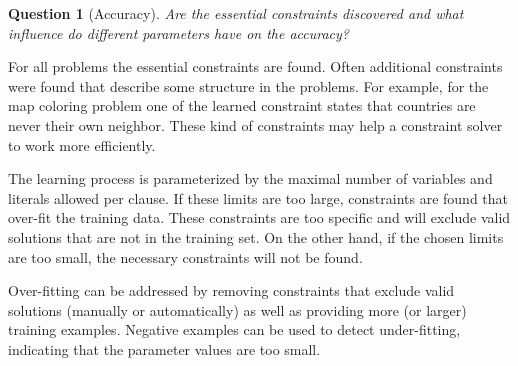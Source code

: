 \documentclass[letterpaper]{article}
\newtheorem{question}{Question}
\theoremstyle{definition}
\begin{document}
\begin{question}[Accuracy]
  Are the essential constraints discovered and what influence do different parameters have on the accuracy?
\end{question}
For all problems the essential constraints are found.
Often additional constraints were found that describe some structure in the problems.
For example, for the map coloring problem one of the learned constraint states that countries are never their own neighbor.
These kind of constraints may help a constraint solver to work more efficiently.

The learning process is parameterized by the maximal number of variables and literals allowed per clause.
If these limits are too large, constraints are found that over-fit the training data.
These constraints are too specific and will exclude valid solutions that are not in the training set.
On the other hand, if the chosen limits are too small, the necessary constraints will not be found.

Over-fitting can be addressed by removing constraints that exclude valid solutions (manually or automatically) as well as providing more (or larger) training examples.
Negative examples can be used to detect under-fitting, indicating that the parameter values are too small.
\end{document}
